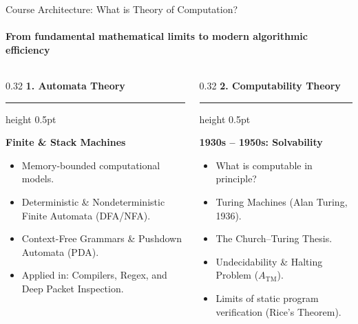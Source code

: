 \documentclass[aspectratio=169, 10pt]{beamer}
\newcommand{\colheader}[1]{%
  {\noindent\footnotesize\bfseries\color{gimpanavy}#1}%
  \vspace{0.02cm}%
  {\color{gimpanavy!30}\hrule height 0.5pt}%
  \vspace{0.05cm}%
}
\newcommand{\cardtitle}[1]{{\noindent\footnotesize\bfseries\color{gimpanavy}#1}\par\vspace{0.03cm}}
\begin{document}
\begin{frame}{Course Architecture: What is Theory of Computation?}
  \framesubtitle{From fundamental mathematical limits to modern algorithmic efficiency}
  
  \begin{columns}[T]
    \begin{column}{0.32\textwidth}
      \colheader{1. Automata Theory}
      \begin{tcolorbox}[conceptcard]
        \cardtitle{Finite \& Stack Machines}
        \begin{itemize}\setlength{\itemsep}{1.5pt}\scriptsize
          \item Memory-bounded computational models.
          \item Deterministic \& Nondeterministic Finite Automata (DFA/NFA).
          \item Context-Free Grammars \& Pushdown Automata (PDA).
          \item Applied in: Compilers, Regex, and Deep Packet Inspection.
        \end{itemize}
      \end{tcolorbox}
    \end{column}
    
    \begin{column}{0.32\textwidth}
      \colheader{2. Computability Theory}
      \begin{tcolorbox}[conceptcard]
        \cardtitle{1930s -- 1950s: Solvability}
        \begin{itemize}\setlength{\itemsep}{1.5pt}\scriptsize
          \item What is computable in principle?
          \item Turing Machines (Alan Turing, 1936).
          \item The Church--Turing Thesis.
          \item Undecidability \& Halting Problem ($A_{\text{TM}}$).
          \item Limits of static program verification (Rice's Theorem).
        \end{itemize}
      \end{tcolorbox}
    \end{column}
    

\end{columns}
\end{frame}
\end{document}
